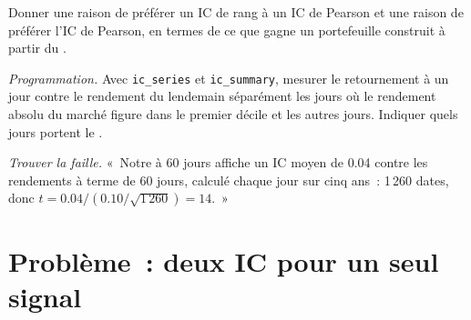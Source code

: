 \begin{exercise}[$\star\star$]\label{exo:rs:anatomy-of-a-predictor:6}
Donner une raison de préférer un IC de rang à un IC de Pearson et une raison de préférer l'IC de Pearson, en termes de ce que gagne un portefeuille construit à partir
du .
\end{exercise}

\begin{exercise}[$\star\star\star$]\label{exo:rs:anatomy-of-a-predictor:7}
\emph{Programmation.} Avec \texttt{ic\_series} et \texttt{ic\_summary}, mesurer le retournement à un jour contre le rendement du lendemain
séparément les jours où le rendement absolu du marché figure dans le premier décile et les autres jours. Indiquer quels jours portent le .
\end{exercise}

\begin{exercise}[$\star\star\star$]\label{exo:rs:anatomy-of-a-predictor:8}
\emph{Trouver la faille.} «~Notre  à 60 jours affiche un IC moyen de 0.04 contre les rendements à terme de 60 jours, calculé chaque jour sur cinq ans~:
1\,260 dates, donc $t = 0.04/(0.10/\sqrt{1\,260}) = 14$.~»
\end{exercise}

\section{Problème~: deux IC pour un seul signal}

